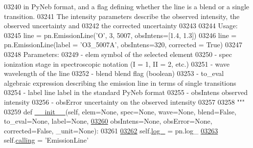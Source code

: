 \begin{DoxyCode}
{{{{{{{{{{{{{{{{{{{{{{03240 \textcolor{stringliteral}{        in PyNeb format, and a flag defining whether the line is a blend or a single transition. }
03241 \textcolor{stringliteral}{    The intensity parameters describe the observed intensity, the observed uncertainty and }
03242 \textcolor{stringliteral}{        the corrected uncertainty}
03243 \textcolor{stringliteral}{        }
03244 \textcolor{stringliteral}{    Usage:}
03245 \textcolor{stringliteral}{        line = pn.EmissionLine('O', 3, 5007, obsIntens=[1.4, 1.3])}
03246 \textcolor{stringliteral}{        line = pn.EmissionLine(label = 'O3\_5007A', obsIntens=320, corrected = True)}
03247 \textcolor{stringliteral}{    }
03248 \textcolor{stringliteral}{    Parameters:}
03249 \textcolor{stringliteral}{        - elem        symbol of the selected element}
03250 \textcolor{stringliteral}{        - spec        ionization stage in spectroscopic notation (I = 1, II = 2, etc.)}
03251 \textcolor{stringliteral}{        - wave        wavelength of the line}
03252 \textcolor{stringliteral}{        - blend       blend flag (boolean)}
03253 \textcolor{stringliteral}{        - to\_eval     algebraic expression describing the emission line in terms of single transitions}
03254 \textcolor{stringliteral}{        - label       line label in the standard PyNeb format}
03255 \textcolor{stringliteral}{        - obsIntens   observed intensity}
03256 \textcolor{stringliteral}{        - obsError    uncertainty on the observed intensity}
03257 \textcolor{stringliteral}{    }
03258 \textcolor{stringliteral}{    """} 
03259     \textcolor{keyword}{def }\hyperlink{classpyneb_1_1core_1_1pynebcore_1_1_emission_line_a4966db926181349d90594f0b6d170c45}{\_\_init\_\_}(self, elem=None, spec=None, wave=None, blend=False, to\_eval=None, label=None,
\hypertarget{pynebcore_8py_source_l03260}{}\hyperlink{classpyneb_1_1core_1_1pynebcore_1_1_emission_line_a4966db926181349d90594f0b6d170c45}{03260}                  obsIntens=\textcolor{keywordtype}{None}, obsError=\textcolor{keywordtype}{None}, corrected=\textcolor{keyword}{False}, \_unit=\textcolor{keywordtype}{None}):
03261         
\hypertarget{pynebcore_8py_source_l03262}{}\hyperlink{classpyneb_1_1core_1_1pynebcore_1_1_emission_line_a85c9edd5e884b93ab84fd6507159e401}{03262}         self.\hyperlink{classpyneb_1_1core_1_1pynebcore_1_1_emission_line_a85c9edd5e884b93ab84fd6507159e401}{log\_} = pn.log\_ 
\hypertarget{pynebcore_8py_source_l03263}{}\hyperlink{classpyneb_1_1core_1_1pynebcore_1_1_emission_line_ac14a01c0f8aac44c5e2381cadfacf2cf}{03263}         self.\hyperlink{classpyneb_1_1core_1_1pynebcore_1_1_emission_line_ac14a01c0f8aac44c5e2381cadfacf2cf}{calling} = \textcolor{stringliteral}{'EmissionLine'}
}}}}}}}}}}}}}}}}}}}}}}
\end{DoxyCode}
